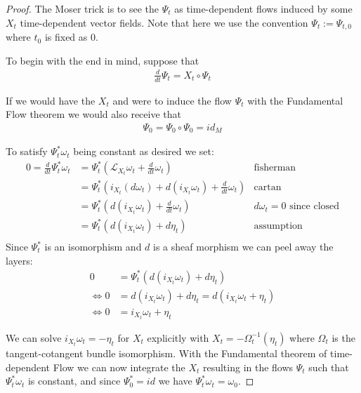 \begin{proof}
The Moser trick is to see the $\Psi_t$ as time-dependent flows induced by some $X_t$ time-dependent vector fields. Note that here we use the convention $\Psi_t := \Psi_{t,0}$ where $t_0$ is fixed as $0$.

To begin with the end in mind, suppose that
\begin{align*}
\frac{d}{dt} \Psi_t = X_t \circ \Psi_t
\end{align*}

If we would have the $X_t$ and were to induce the flow $\Psi_t$ with the Fundamental Flow theorem we would also receive that
\begin{align*}
\Psi_0 = \Psi_0 \circ \Psi_0 = id_M
\end{align*}

To satisfy $\Psi^*_t \omega_t$ being constant as desired we set:
\begin{align*}
0 = \frac{d}{dt} \Psi^*_t \omega_t &= \Psi^*_t \left( \mathcal{L}_{X_t} \omega_t + \frac{d}{dt} \omega_t \right) &\text{fisherman}\\
&= \Psi^*_t \left( i_{X_t}(d\omega_t) + d(i_{X_t}\omega_t)+\frac{d}{dt}\omega_t \right) & \text{cartan} \\
&= \Psi^*_t \left( d(i_{X_t}\omega_t)+\frac{d}{dt}\omega_t \right) & d\omega_t=0 \text{ since closed}\\
&= \Psi^*_t \left( d(i_{X_t}\omega_t)+d\eta_t  \right) & \text{assumption} \\
\end{align*}
Since $\Psi^*_t$ is an isomorphism and $d$ is a sheaf morphism we can peel away the layers:
\begin{align*}
0 &= \Psi^*_t \left( d(i_{X_t}\omega_t)+d\eta_t  \right) \\
\Leftrightarrow 0 &= d(i_{X_t}\omega_t)+d\eta_t = d(i_{X_t}\omega_t +\eta_t )\\
\Leftrightarrow 0 &= i_{X_t}\omega_t +\eta_t
\end{align*}

We can solve $i_{X_t}\omega_t = -\eta_t$ for $X_t$ explicitly with $X_t = -\Omega^{-1}_t(\eta_t)$ where $\Omega_t$ is the tangent-cotangent bundle isomorphism.  With the Fundamental theorem of time-dependent Flow we can now integrate the $X_t$ resulting in the flows $\Psi_t$ such that $\Psi^*_t \omega_t$ is constant, and since $\Psi^*_0 = id$ we have $\Psi^*_t \omega_t = \omega_0$. 

\end{proof}



